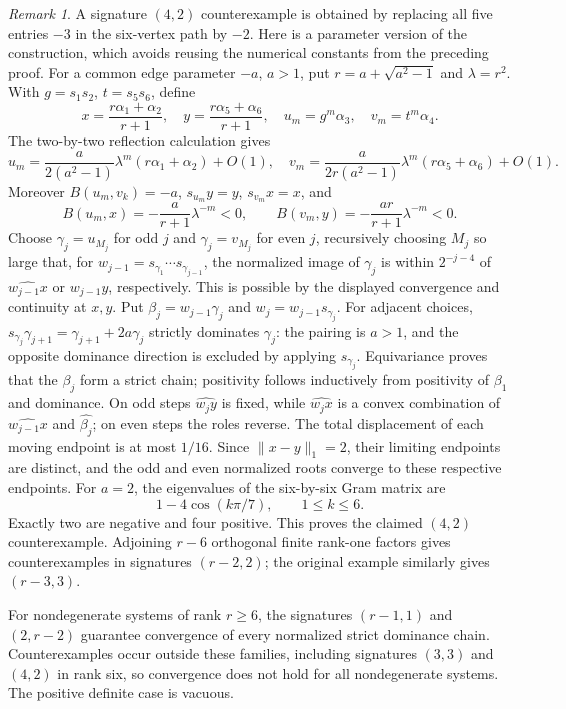 \documentclass[11pt,reqno]{amsart}
\theoremstyle{plain}
\theoremstyle{definition}
\theoremstyle{remark}
\newtheorem{remark}[theorem]{Remark}
\numberwithin{equation}{section}
\begin{document}
\begin{remark}\label{rem:42-counterexample}
A signature $(4,2)$ counterexample is obtained by replacing all five entries $-3$ in the six-vertex path by $-2$. Here is a parameter version of the construction, which avoids reusing the numerical constants from the preceding proof.
For a common edge parameter $-a$, $a>1$, put $r=a+\sqrt{a^2-1}$ and $\lambda=r^2$. With $g=s_1s_2$, $t=s_5s_6$, define
\[
 x=\frac{r\alpha_1+\alpha_2}{r+1},\quad
 y=\frac{r\alpha_5+\alpha_6}{r+1},\quad
 u_m=g^m\alpha_3,\quad v_m=t^m\alpha_4.
\]
The two-by-two reflection calculation gives
\[
 u_m=\frac{a}{2(a^2-1)}\lambda^m(r\alpha_1+\alpha_2)+O(1),\quad
 v_m=\frac{a}{2r(a^2-1)}\lambda^m(r\alpha_5+\alpha_6)+O(1).
\]
Moreover $B(u_m,v_k)=-a$, $s_{u_m}y=y$, $s_{v_m}x=x$, and
\[
 B(u_m,x)=-\frac{a}{r+1}\lambda^{-m}<0,\qquad
 B(v_m,y)=-\frac{ar}{r+1}\lambda^{-m}<0.
\]
Choose $\gamma_j=u_{M_j}$ for odd $j$ and $\gamma_j=v_{M_j}$ for even $j$, recursively choosing $M_j$ so large that, for $w_{j-1}=s_{\gamma_1}\cdots s_{\gamma_{j-1}}$, the normalized image of $\gamma_j$ is within $2^{-j-4}$ of $\widehat{w_{j-1}x}$ or $\widehat{w_{j-1}y}$, respectively. This is possible by the displayed convergence and continuity at $x,y$. Put $\beta_j=w_{j-1}\gamma_j$ and $w_j=w_{j-1}s_{\gamma_j}$.
For adjacent choices, $s_{\gamma_j}\gamma_{j+1}=\gamma_{j+1}+2a\gamma_j$ strictly dominates $\gamma_j$: the pairing is $a>1$, and the opposite dominance direction is excluded by applying $s_{\gamma_j}$. Equivariance proves that the $\beta_j$ form a strict chain; positivity follows inductively from positivity of $\beta_1$ and dominance. On odd steps $\widehat{w_jy}$ is fixed, while $\widehat{w_jx}$ is a convex combination of $\widehat{w_{j-1}x}$ and $\widehat{\beta_j}$; on even steps the roles reverse. The total displacement of each moving endpoint is at most $1/16$. Since $\|x-y\|_1=2$, their limiting endpoints are distinct, and the odd and even normalized roots converge to these respective endpoints.
For $a=2$, the eigenvalues of the six-by-six Gram matrix are
\[
 1-4\cos(k\pi/7),\qquad 1\leq k\leq6.
\]
Exactly two are negative and four positive. This proves the claimed $(4,2)$ counterexample. Adjoining $r-6$ orthogonal finite rank-one factors gives counterexamples in signatures $(r-2,2)$; the original example similarly gives $(r-3,3)$.
\end{remark}

For nondegenerate systems of rank $r\geq6$, the signatures $(r-1,1)$ and $(2,r-2)$ guarantee convergence of every normalized strict dominance chain. Counterexamples occur outside these families, including signatures $(3,3)$ and $(4,2)$ in rank six, so convergence does not hold for all nondegenerate systems. The positive definite case is vacuous.
\end{document}
